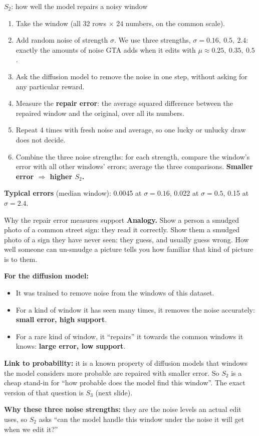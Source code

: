 \documentclass[aspectratio=169,10pt]{beamer}
\begin{document}
\begin{frame}{$S_2$: how well the model repairs a noisy window}
\begin{enumerate}
\item Take the window (all 32 rows $\times$ 24 numbers, on the common scale).
\item Add random noise of strength $\sigma$. We use three strengths, $\sigma = 0.16,\ 0.5,\ 2.4$: exactly the amounts of noise GTA adds when it edits with $\mu \approx 0.25,\ 0.35,\ 0.5$.
\item Ask the diffusion model to remove the noise in one step, without asking for any particular reward.
\item Measure the \textbf{repair error}: the average squared difference between the repaired window and the original, over all its numbers.
\item Repeat 4 times with fresh noise and average, so one lucky or unlucky draw does not decide.
\item Combine the three noise strengths: for each strength, compare the window's error with all other windows' errors; average the three comparisons. \textbf{Smaller error $\Rightarrow$ higher $S_2$.}
\end{enumerate}
\vspace{0.3em}
\textbf{Typical errors} (median window): 0.0045 at $\sigma = 0.16$, 0.022 at $\sigma = 0.5$, 0.15 at $\sigma = 2.4$.
\end{frame}

\begin{frame}[shrink=5]{Why the repair error measures support}
\textbf{Analogy.} Show a person a smudged photo of a common street sign: they read it correctly. Show them a smudged photo of a sign they have never seen: they guess, and usually guess wrong. How well someone can un-smudge a picture tells you how familiar that kind of picture is to them.
\vspace{0.6em}

\textbf{For the diffusion model:}
\begin{itemize}
\item It was trained to remove noise from the windows of this dataset.
\item For a kind of window it has seen many times, it removes the noise accurately: \textbf{small error, high support}.
\item For a rare kind of window, it ``repairs'' it towards the common windows it knows: \textbf{large error, low support}.
\end{itemize}
\vspace{0.6em}
\textbf{Link to probability:} it is a known property of diffusion models that windows the model considers more probable are repaired with smaller error. So $S_2$ is a cheap stand-in for ``how probable does the model find this window''. The exact version of that question is $S_3$ (next slide).
\vspace{0.4em}

\textbf{Why these three noise strengths:} they are the noise levels an actual edit uses, so $S_2$ asks ``can the model handle this window under the noise it will get when we edit it?''
\end{frame}
\end{document}
